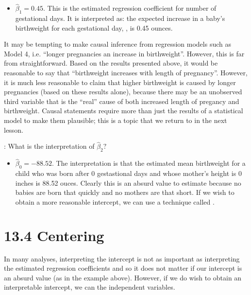 \documentclass[letterpaper,10pt,english]{jupyterBook}
\begin{document}
\sphinxAtStartPar
{}
\begin{itemize}
\item {} 
\sphinxAtStartPar
\(\hat{\beta}_1=0.45\). This is the estimated regression coefficient for number of gestational days. It is interpreted as: the expected increase in a baby’s birthweight for each gestational day, , is 0.45 ounces.

\end{itemize}

\sphinxAtStartPar
It may be tempting to make causal inference from regression models such as Model 4, i.e. “longer pregnancies  an increase in birthweight”. However, this is far from straightforward. Based on the results presented above, it would be reasonable to say that “birthweight increases with length of pregnancy”. However, it is much less reasonable to claim that higher birthweight is caused by longer pregnancies (based on these results alone), because there may be an unobserved third variable that is the “real” cause of both increased length of pregancy and birthweight. Causal statements require more than just the results of a statistical model to make them plausible; this is a topic that we return to in the next lesson.

\sphinxAtStartPar
{}: What is the interpretation of \(\hat{\beta}_2?\)

\sphinxAtStartPar
{}
\begin{itemize}
\item {} 
\sphinxAtStartPar
\(\hat{\beta}_0=-88.52\). The interpretation is that the estimated mean birthweight for a child who was born after 0 gestastional days and whose mother’s height is 0 inches is \sphinxhyphen{}88.52 ouces. Clearly this is an absurd value to estimate because no babies are born that quickly and no mothers are that short. If we wish to obtain a more reasonable intercept, we can use a technique called .

\end{itemize}


\section{13.4 Centering}
\label{\detokenize{13.e. Linear Regression II:centering}}\label{\detokenize{13.e. Linear Regression II::doc}}
\sphinxAtStartPar
In many analyses, interpreting the intercept is not as important as interpreting the estimated regression coefficients and so it does not matter if our intercept is an absurd value (as in the example above). However, if we do wish to obtain an interpretable intercept, we can  the independent variables.
\end{document}
